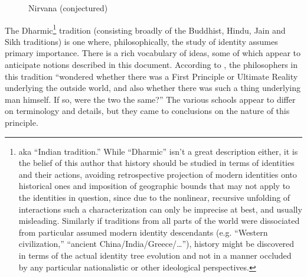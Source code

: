 \documentclass[pra,twocolumn,groupedaddress,10pt]{revtex4}
\theoremstyle{definition}
\begin{document}
\begin{figure}[htp]
	\caption{\label{fig:nirvana}Nirvana (conjectured)}
\end{figure}

The Dharmic\footnote{aka ``Indian tradition.'' While ``Dharmic'' isn't a great description either, it is the belief of this author that history should be studied in terms of identities and their actions, avoiding retrospective projection of modern identities onto historical ones and imposition of geographic bounds that may not apply to the identities in question, since due to the nonlinear, recursive unfolding of interactions such a characterization can only be imprecise at best, and usually misleading. Similarly if traditions from all parts of the world were dissociated from particular assumed modern identity descendants (e.g. ``Western civilization,'' ``ancient China/India/Greece/\ldots''), history might be discovered in terms of the actual identity tree evolution and not in a manner occluded by any particular nationalistic or other ideological perspectives.} tradition (consisting broadly of the Buddhist, Hindu, Jain and Sikh traditions) is one where, philosophically, the study of identity assumes primary importance. There is a rich vocabulary of ideas, some of which appear to anticipate notions described in this document. According to \cite{atmabodha}, the philosophers in this tradition ``wondered whether there was a First Principle or Ultimate Reality underlying the outside world, and also whether there was such a thing underlying man himself. If so, were the two the same?'' The various schools appear to differ on terminology and details, but they came to conclusions on the nature of this principle.
\end{document}
